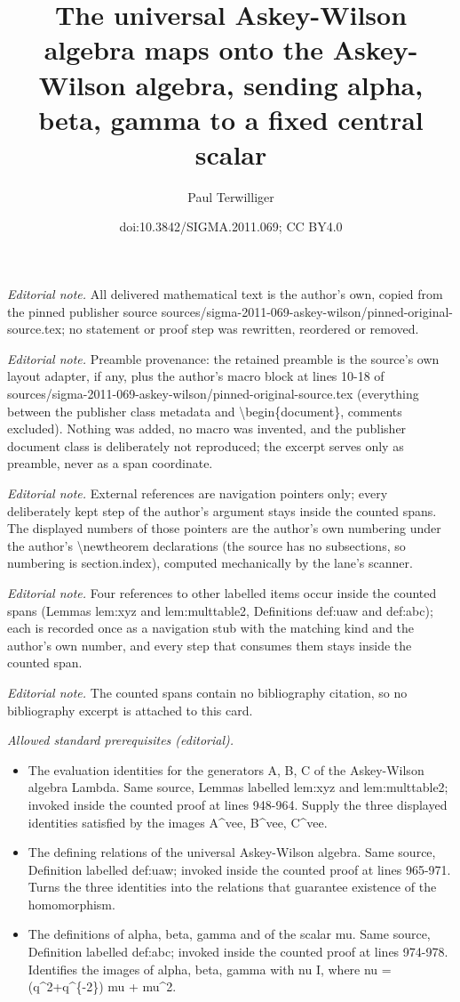 \documentclass[10pt,a4paper]{amsart}
\title{The universal Askey-Wilson algebra maps onto the Askey-Wilson algebra, sending alpha, beta, gamma to a fixed central scalar}
\author{Paul Terwilliger}
\date{doi:10.3842/SIGMA.2011.069; CC BY4.0}
\begin{document}
\maketitle
\noindent\textit{Editorial note.} All delivered mathematical text is the author's own, copied from the pinned publisher source sources/sigma-2011-069-askey-wilson/pinned-original-source.tex; no statement or proof step was rewritten, reordered or removed.\par\medskip
\noindent\textit{Editorial note.} Preamble provenance: the retained preamble is the source's own layout adapter, if any, plus the author's macro block at lines 10-18 of sources/sigma-2011-069-askey-wilson/pinned-original-source.tex (everything between the publisher class metadata and \textbackslash{}begin\{document\}, comments excluded). Nothing was added, no macro was invented, and the publisher document class is deliberately not reproduced; the excerpt serves only as preamble, never as a span coordinate.\par\medskip
\noindent\textit{Editorial note.} External references are navigation pointers only; every deliberately kept step of the author's argument stays inside the counted spans. The displayed numbers of those pointers are the author's own numbering under the author's \textbackslash{}newtheorem declarations (the source has no subsections, so numbering is section.index), computed mechanically by the lane's scanner.\par\medskip
\noindent\textit{Editorial note.} Four references to other labelled items occur inside the counted spans (Lemmas lem:xyz and lem:multtable2, Definitions def:uaw and def:abc); each is recorded once as a navigation stub with the matching kind and the author's own number, and every step that consumes them stays inside the counted span.\par\medskip
\noindent\textit{Editorial note.} The counted spans contain no bibliography citation, so no bibliography excerpt is attached to this card.\par\medskip
\noindent\textit{Allowed standard prerequisites (editorial).}\begin{itemize}
\item The evaluation identities for the generators A, B, C of the Askey-Wilson algebra Lambda. Same source, Lemmas labelled lem:xyz and lem:multtable2; invoked inside the counted proof at lines 948-964. Supply the three displayed identities satisfied by the images A\textasciicircum{}vee, B\textasciicircum{}vee, C\textasciicircum{}vee.
\item The defining relations of the universal Askey-Wilson algebra. Same source, Definition labelled def:uaw; invoked inside the counted proof at lines 965-971. Turns the three identities into the relations that guarantee existence of the homomorphism.
\item The definitions of alpha, beta, gamma and of the scalar mu. Same source, Definition labelled def:abc; invoked inside the counted proof at lines 974-978. Identifies the images of alpha, beta, gamma with nu I, where nu = (q\textasciicircum{}2+q\textasciicircum{}\{-2\}) mu + mu\textasciicircum{}2.
\end{itemize}\medskip
\end{document}
